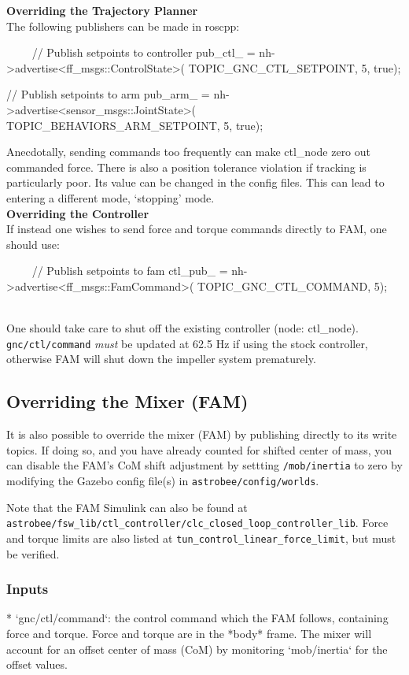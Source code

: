 \documentclass{article}
\begin{document}
\noindent\textbf{Overriding the Trajectory Planner}
\\
\indent The following publishers can be made in roscpp:
\begin{markdown}
~~~~
 //  Publish setpoints to controller
 pub_ctl_ = nh->advertise<ff_msgs::ControlState>(
   TOPIC_GNC_CTL_SETPOINT, 5, true);

 //  Publish setpoints to arm
 pub_arm_ = nh->advertise<sensor_msgs::JointState>(
   TOPIC_BEHAVIORS_ARM_SETPOINT, 5, true);
~~~~
\end{markdown}
Anecdotally, sending commands too frequently can make ctl\_node zero out commanded force. There is also a position tolerance violation if tracking is particularly poor. Its value can be changed in the config files. This can lead to entering a different mode, `stopping' mode.
\\

\noindent\textbf{Overriding the Controller}
\\
\indent If instead one wishes to send force and torque commands directly to FAM, one should use:
\begin{markdown}
~~~~
//  Publish setpoints to fam
ctl_pub_ = nh->advertise<ff_msgs::FamCommand>(
TOPIC_GNC_CTL_COMMAND, 5);
~~~~
\end{markdown}

One should take care to shut off the existing controller (node: ctl\_node). \texttt{gnc/ctl/command} \textit{must} be updated at 62.5 Hz if using the stock controller, otherwise FAM will shut down the impeller system prematurely.


\subsection{Overriding the Mixer (FAM)}

It is also possible to override the mixer (FAM) by publishing directly to its write topics. If doing so, and you have already counted for shifted center of mass, you can disable the FAM's CoM shift adjustment by settting \texttt{/mob/inertia} 
to zero by modifying the Gazebo config file(s) in \texttt{astrobee/config/worlds}.

Note that the FAM Simulink can also be found at\\
\texttt{astrobee/fsw\_lib/ctl\_controller/clc\_closed\_loop\_controller\_lib}. Force and torque limits are also listed at \texttt{tun\_control\_linear\_force\_limit}, but must be verified.

\subsubsection{Inputs}
\begin{markdown}
* `gnc/ctl/command`: the control command which the FAM follows, containing force and torque. Force and torque are in the *body* frame. The mixer will account for an offset center of mass (CoM) by monitoring `mob/inertia` for the offset values.
\end{markdown}
\end{document}
